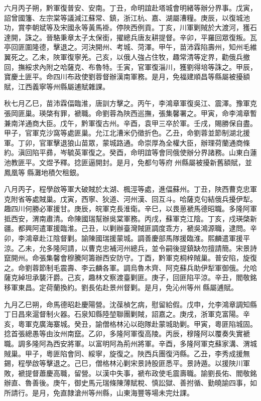 \begin{pinyinscope}
六月丙子朔，黔軍復普安、安南。丁丑，命明誼赴塔城會明緒等辦分界事。戊寅，詔曾國籓、左宗棠等議減江蘇常、鎮，浙江杭、嘉、湖屬漕糧。庚辰，以復城池功，賞李朝斌等及宋國永等黃馬褂。停陜西例貢。丁亥，川軍剿賊於大渡河，獲石達開，誅之。晉駱秉章太子太保銜，擢總兵唐友耕提督。辛卯，平羅回眾復叛。瓦亭回匪圍隆德，擊退之。河決開州、考城、菏澤。甲午，苗沛霖陷壽州，知州毛維翼死之。乙未，陜軍復寧羌。己亥，以俄人強占住牧，趣常清等定界，勸俄兵撤回，撫綏求內附之哈薩克、布魯特。壬寅，官軍復淄川，獲劉得培等誅之。甲辰，寶慶土匪平。命四川布政使劉蓉督辦漢南軍務。是月，免福建順昌等縣屬被擾額賦，江西義寧等州縣屬逋賦雜課。

秋七月乙巳，苗沛霖偪臨淮，唐訓方擊之。丙午，李鴻章軍復吳江、震澤。豫軍克張岡匪巢。瑛棨有罪，褫職。命劉蓉為陜西巡撫，張集馨署之。甲寅，命李鴻章暫兼南洋通商大臣。戊午，黔軍復古州。辛酉，袁甲三卒於軍。壬戌，賜勝保自盡。甲子，官軍克沙窩等處匪巢。允江北漕米仍徵折色。乙丑，命劉蓉並節制湖北援軍。丁卯，官軍擊退狼山苗眾，蒙城路通。命崇厚為全權大臣，辦理荷蘭通商條約。滇回陷平彞，岑毓英軍復之。癸酉，命明誼等會同俄使辦分界諸務。山東白蓮池教匪平。文煜予釋。捻匪逼開封。是月，免都勻等府州縣屬被擾新舊額賦，並鳳凰等縣灘地積欠租銀。

八月丙子，程學啟等軍大破賊於太湖、楓涇等處，進偪蘇州。丁丑，陜西曹克忠軍克附省等處賊巢。戊寅，西寧、狄道、河州漢、回互斗。哈薩克句結俄兵擾伊犁。趣四川何勝必軍援甘。庚辰，皖軍克長淮衛。辛巳，以畏葸褫馬德昭職。多隆阿軍抵西安，渭南肅清。命陳國瑞幫辦吳棠軍務。丙戌，蘇軍克江陰。丁亥，戍瑛棨新疆。都興阿遣軍援臨淮。己丑，以剿辦臺灣賊匪調度乖方，褫吳鴻源職，逮問。辛卯，李鴻章赴江陰督剿。諭陳國瑞援蒙城。調善慶部馬隊援臨淮。熙麟遣軍援平涼。乙未，允多隆阿請，以曹克忠補河州總兵，並令嗣後提鎮缺勿擅請簡。宋景詩竄開州。命張集馨會穆騰阿籌辦西安防守。丁酉，黔軍克桐梓賊巢。普安陷，旋復之。命劉蓉節制毛震壽、李云麟各軍。調烏魯木齊、阿克蘇兵助伊犁軍御俄。允哈薩克綽坦承襲汗爵。己亥，趣林文察渡臺剿匪。庚子，回匪陷平涼。辛丑，閻敬銘移軍東昌。定荷蘭換約。劉長佑赴景州督剿。是月，免沁州等州縣屬逋賦。

九月乙巳朔，命馬德昭赴慶陽營。沈葆楨乞病，慰留給假。戊申，允李鴻章調知縣丁日昌來滬督制火器。石泉知縣陸堃聯團剿賊，詔嘉之。庚戌，浙軍克富陽。辛亥，粵軍克廣海寨城。癸丑，諭僧格林沁以砲隊赴蒙城助剿。甲寅，粵匪陷城固。捻首張總愚等由汝州南竄。乙卯，多隆阿軍復高陵。丙辰，穆隆阿以覆奏失實褫職。調多隆阿為西安將軍。以富明阿為荊州將軍。辛酉，多隆阿軍克蘇家溝、渭城賊巢。甲子，粵匪陷會同、綏寧，旋復之。陜西兵團復沔縣。乙丑，李秀成援無錫，程學啟等擊退之。己巳，僧格林沁剿宋景詩股匪悉平。景詩遁。以援陜川軍敗，褫提督蕭慶高職，留營。以漢中失事，褫布政使毛震壽職。諭劉長佑、閻敬銘辦直、魯善後。庚午，御史馬元瑞條陳薄賦稅、慎訟獄、善拊循、勤曉諭四事，如所請行。是月，免直隸滄州等州縣，山東海豐等場未完灶課。


\end{pinyinscope}
